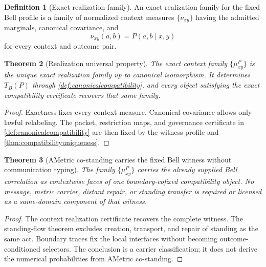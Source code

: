 \documentclass[11pt]{article}
\newtheorem{theorem}{Theorem}[section]
\theoremstyle{definition}
\newtheorem{definition}[theorem]{Definition}
\begin{document}
\begin{definition}[Exact realization family]\label{def:exactrealization}
An exact realization family for the fixed Bell profile is a family of normalized context measures $\{\nu_{xy}\}$ having the admitted marginals, canonical covariance, and
\[
\nu_{xy}(a,b)=P(a,b\mid x,y)
\]
for every context and outcome pair.
\end{definition}

\begin{theorem}[Realization universal property]\label{thm:realizationuniversal}
The exact context family $\{\mu^P_{xy}\}$ is the unique exact realization family up to canonical isomorphism. It determines $T_B(P)$ through \cref{def:canonicalcompatibility}, and every object satisfying the exact compatibility certificate recovers that same family.
\end{theorem}

\begin{proof}
Exactness fixes every context measure. Canonical covariance allows only lawful relabeling. The packet, restriction maps, and governance certificate in \cref{def:canonicalcompatibility} are then fixed by the witness profile and \cref{thm:compatibilityuniqueness}.
\end{proof}

\begin{theorem}[AMetric co-standing carries the fixed Bell witness without communication typing]\label{thm:costandingcorr}
The family $\{\mu^P_{xy}\}$ carries the already supplied Bell correlation as contextwise faces of one boundary-cofixed compatibility object. No message, metric carrier, distant repair, or standing transfer is required or licensed as a same-domain component of that witness.
\end{theorem}

\begin{proof}
The context realization certificate recovers the complete witness. The standing-flow theorem excludes creation, transport, and repair of standing as the same act. Boundary traces fix the local interfaces without becoming outcome-conditioned selectors. The conclusion is a carrier classification; it does not derive the numerical probabilities from AMetric co-standing.
\end{proof}
\end{document}

